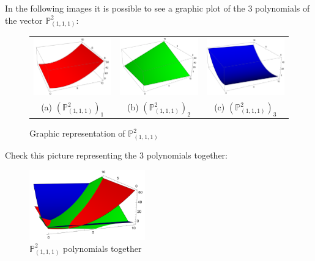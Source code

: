 \documentclass[12pt,a4]{article}
\theoremstyle{plain}
\begin{document}
In the following images it is possible to see a graphic plot of the 3 polynomials of the vector $\mathbb P_{(1,1,1)}^2$:
\begin{figure}[h]
    \centering\begin{tabular}{ccc}
      \includegraphics[width=4.5cm]{./img/laguerre1.png} & 
      \includegraphics[width=4.5cm]{./img/laguerre2.png} &
      \includegraphics[width=4.5cm]{./img/laguerre3.png} \\
      (a) $(\mathbb P_{(1,1,1)}^2)_1$ & (b) $(\mathbb P_{(1,1,1)}^2)_2$ & (c) $(\mathbb P_{(1,1,1)}^2)_3$  \\
    \end{tabular}
    \caption{Graphic representation of $\mathbb P_{(1,1,1)}^2$}
    \label{fig:example}
  \end{figure}

  Check this picture representing the 3 polynomials together:

  \begin{figure}[h]
    \centering\includegraphics[width=5cm]{./img/EjemploLaguerre.png}
    \caption{$\mathbb P_{(1,1,1)}^2$ polynomials together}
    \label{fig:example-2}
  \end{figure}
\end{document}
